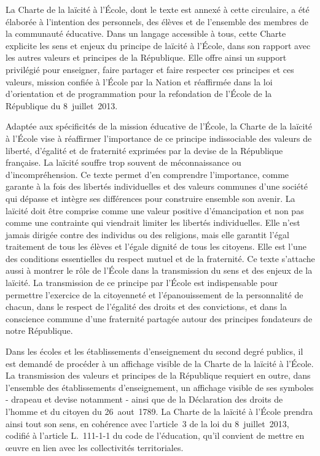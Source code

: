 La Charte de la laïcité à l’École, dont le texte est annexé à cette circulaire, a été élaborée à l’intention des personnels, des élèves et de l’ensemble des membres de la communauté éducative. Dans un langage accessible à tous, cette Charte explicite les sens et enjeux du principe de laïcité à l’École, dans son rapport avec les autres valeurs et principes de la République. Elle offre ainsi un support privilégié pour enseigner, faire partager et faire respecter ces principes et ces valeurs, mission confiée à l’École par la Nation et réaffirmée dans la loi d’orientation et de programmation pour la refondation de l’École de la République du 8~juillet~2013.

Adaptée aux spécificités de la mission éducative de l’École, la Charte de la laïcité à l’École vise à réaffirmer l’importance de ce principe indissociable des valeurs de liberté, d’égalité et de fraternité exprimées par la devise de la République française. La laïcité souffre trop souvent de méconnaissance ou d’incompréhension. Ce texte permet d’en comprendre l’importance, comme garante à la fois des libertés individuelles et des valeurs communes d’une société qui dépasse et intègre ses différences pour construire ensemble son avenir. La laïcité doit être comprise comme une valeur positive d’émancipation et non pas comme une contrainte qui viendrait limiter les libertés individuelles. Elle n’est jamais dirigée contre des individus ou des religions, mais elle garantit l’égal traitement de tous les élèves et l’égale dignité de tous les citoyens. Elle est l’une des conditions essentielles du respect mutuel et de la fraternité. Ce texte s’attache aussi à montrer le rôle de l’École dans la transmission du sens et des enjeux de la laïcité. La transmission de ce principe par l’École est indispensable pour permettre l’exercice de la citoyenneté et l’épanouissement de la personnalité de chacun, dans le respect de l’égalité des droits et des convictions, et dans la conscience commune d’une fraternité partagée autour des principes fondateurs de notre République.

Dans les écoles et les établissements d’enseignement du second degré publics, il est demandé de procéder à un affichage visible de la Charte de la laïcité à l’École. La transmission des valeurs et principes de la République requiert en outre, dans l’ensemble des établissements d’enseignement, un affichage visible de ses symboles - drapeau et devise notamment - ainsi que de la Déclaration des droits de l’homme et du citoyen du 26~aout~1789. La Charte de la laïcité à l’École prendra ainsi tout son sens, en cohérence avec l’article~3 de la loi du 8~juillet~2013, codifié à l’article L.~111-1-1 du code de l’éducation, qu’il convient de mettre en œuvre en lien avec les collectivités territoriales.

